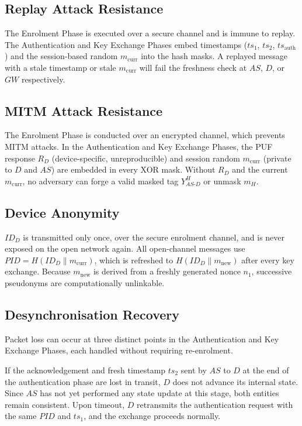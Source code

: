 \subsection{Replay Attack Resistance}

The Enrolment Phase is executed over a secure channel and is immune to replay.
The Authentication and Key Exchange Phases embed timestamps ($ts_1$, $ts_2$,
$ts_{\mathrm{auth}}$) and the session-based random $m_{\mathrm{curr}}$ into the hash
masks.
A replayed message with a stale timestamp or stale $m_{\mathrm{curr}}$ will fail the
freshness check at $AS$, $D$, or $GW$ respectively.

\subsection{MITM Attack Resistance}

The Enrolment Phase is conducted over an encrypted channel, which prevents MITM attacks.
In the Authentication and Key Exchange Phases, the PUF response $R_D$
(device-specific, unreproducible) and session random $m_{\mathrm{curr}}$ (private to
$D$ and $AS$) are embedded in every XOR mask.
Without $R_D$ and the current $m_{\mathrm{curr}}$, no adversary can forge a valid
masked tag $Y_{AS\text{-}D}^H$ or unmask $m_H$.

\subsection{Device Anonymity}

$ID_D$ is transmitted only once, over the secure enrolment channel, and is never
exposed on the open network again.
All open-channel messages use $\mathit{PID} = H(ID_D \| m_{\mathrm{curr}})$,
which is refreshed to $H(ID_D \| m_{\mathrm{new}})$ after every key exchange.
Because $m_{\mathrm{new}}$ is derived from a freshly generated nonce $n_1$,
successive pseudonyms are computationally unlinkable.

\subsection{Desynchronisation Recovery}

Packet loss can occur at three distinct points in the Authentication and Key Exchange
Phases, each handled without requiring re-enrolment.

If the acknowledgement and fresh timestamp $ts_2$ sent by $AS$ to $D$ at the end of
the authentication phase are lost in transit, $D$ does not advance its internal state.
Since $AS$ has not yet performed any state update at this stage, both entities remain
consistent.
Upon timeout, $D$ retransmits the authentication request with the same $\mathit{PID}$
and $ts_1$, and the exchange proceeds normally.

